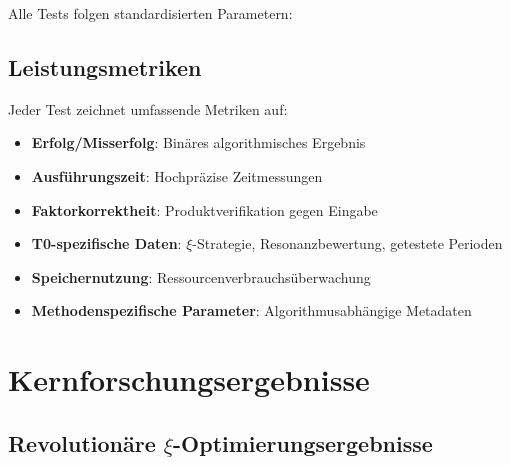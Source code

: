 	Alle Tests folgen standardisierten Parametern:
	\begin{table}[H]
		\centering
		\caption{Standardisierte Testparameter}
	\end{table}
	
	\subsection{Leistungsmetriken}
	
	Jeder Test zeichnet umfassende Metriken auf:
	\begin{itemize}
		\item \textbf{Erfolg/Misserfolg}: Binäres algorithmisches Ergebnis
		\item \textbf{Ausführungszeit}: Hochpräzise Zeitmessungen
		\item \textbf{Faktorkorrektheit}: Produktverifikation gegen Eingabe
		\item \textbf{T0-spezifische Daten}: $\xi$-Strategie, Resonanzbewertung, getestete Perioden
		\item \textbf{Speichernutzung}: Ressourcenverbrauchsüberwachung
		\item \textbf{Methodenspezifische Parameter}: Algorithmusabhängige Metadaten
	\end{itemize}
	
	\section{Kernforschungsergebnisse}
	
	\subsection{Revolutionäre $\xi$-Optimierungsergebnisse}
	
